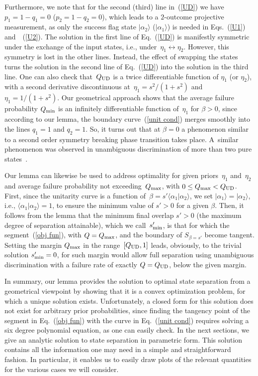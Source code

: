\documentclass[aps,pra,twocolumn,showpacs]{revtex4-1}
\begin{document}
{Furthermore, we note that for the second (third) line in~(\ref{UD}) we have $p_1=1-q_1=0$ ($p_2=1-q_2=0$), which leads to a $2$-outcome projective measurement, as only the success flag state $|\alpha_2\rangle$  ($|\alpha_1\rangle$) is needed in Eqs.~(\ref{U1}) and~~(\ref{U2}). The solution in the first line of Eq.~(\ref{UD}) is manifestly symmetric under the exchange of the input states, i.e., under~$\eta_1\leftrightarrow\eta_2$. However, this symmetry is lost in the other lines. Instead,  the effect of swapping the states turns the solution in the second line of Eq.~(\ref{UD}) into the solution in the third line.  One can also check that~$Q_{\rm UD}$ is a twice differentiable function of $\eta_1$ (or $\eta_2$), with a second derivative discontinuous at~$\eta_1=s^2/(1+s^2)$ and $\eta_1=1/(1+s^2)$. Our geometrical approach shows that the average failure probability $Q_{\rm min}$ is an infinitely differentiable function of~$\eta_1$ for $\beta>0$, since according to our lemma, the boundary curve~(\ref{unit cond}) merges smoothly into the lines $q_1=1$ and $q_2=1$. 
%
So, it turns out that at $\beta=0$ a phenomenon similar to a second order symmetry breaking phase transition takes place. A~similar phenomenon was observed in unambiguous discrimination of more than two pure states~\cite{Bergou1}. 

Our lemma can likewise be used to address optimality for given priors~$\eta_1$ and~$\eta_2$ and average failure probability not exceeding~$Q_{\rm max}$, with $0\le Q_{\rm max}< Q_{\rm UD}$. First, since the unitarity curve is a function of~$\beta=s' \langle\alpha_1|\alpha_2\rangle$, we set $|\alpha_1\rangle=|\alpha_2\rangle$, i.e., $\langle\alpha_1|\alpha_2\rangle=1$, to ensure the minimum value of $s'>0$ for a given $\beta$. Then, it follows from the lemma that the minimum final overlap $s'>0$ (the maximum degree of separation attainable), which we call~$s'_{\rm min}$, is that for which the segment~(\ref{obj fun}), with $Q=Q_{\rm max}$, and the boundary of $S_{\beta=s'}$ become tangent. Setting the margin $Q_{\rm max}$ in the  range~$[Q_{\rm UD}, 1]$ leads, obviously, to the trivial solution $s'_{\rm min}=0$, for such margin would allow full separation using unambiguous discrimination with a failure rate of exactly $Q=Q_{\rm UD}$, below the given margin. 


In summary, our lemma provides the solution to optimal state separation from a geometrical viewpoint by showing that it is a convex optimization problem, for which a unique solution exists. Unfortunately,  a closed form for this solution does not exist for arbitrary prior probabilities, since finding the tangency point of the segment in Eq.~(\ref{obj fun}) with the curve in Eq.~(\ref{unit cond}) requires solving a six degree polynomial equation, as one can easily check. In the next sections, we give an analytic solution to state separation in parametric form. This solution contains all the information one may need in a simple and straightforward fashion. In particular, it enables us to easily draw plots of the relevant quantities for the various cases we will consider. 

}
\end{document}
